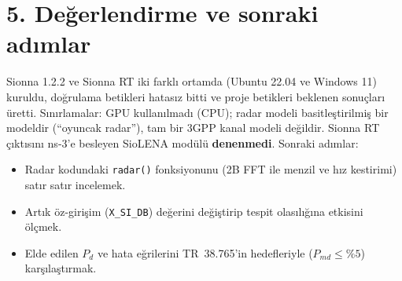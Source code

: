 \documentclass[10.5pt,a4paper]{article}
\begin{document}
\section*{5. Değerlendirme ve sonraki adımlar}
Sionna 1.2.2 ve Sionna RT iki farklı ortamda (Ubuntu 22.04 ve Windows 11) kuruldu, doğrulama betikleri hatasız bitti ve proje betikleri beklenen sonuçları üretti. Sınırlamalar: GPU kullanılmadı (CPU); radar modeli basitleştirilmiş bir modeldir (``oyuncak radar''), tam bir 3GPP kanal modeli değildir. Sionna RT çıktısını ns-3'e besleyen SioLENA modülü \textbf{denenmedi}. Sonraki adımlar:
\begin{itemize}
\item Radar kodundaki \texttt{radar()} fonksiyonunu (2B FFT ile menzil ve hız kestirimi) satır satır incelemek.
\item Artık öz-girişim (\texttt{X\_SI\_DB}) değerini değiştirip tespit olasılığına etkisini ölçmek.
\item Elde edilen $P_d$ ve hata eğrilerini TR~38.765'in hedefleriyle ($P_{md}\le\%5$) karşılaştırmak.
\end{itemize}
\end{document}
